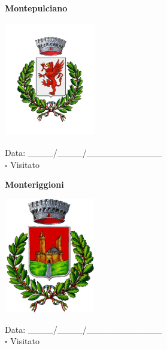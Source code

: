 \documentclass[a5paper,12pt]{article}
\begin{document}
\vspace{0.7cm}

\noindent
\begin{minipage}[t]{0.45\textwidth}
    \begin{center}
        \textbf{Montepulciano}
    \end{center}
    \vspace{-0.5cm} %
    \begin{center}
        \includegraphics[height= 5cm, width=4cm]{Toscana/Stemma Montepulciano.png}
    \end{center}
    \vspace{-0.4cm} %
    \begin{flushleft}
        Data: \_\_\_\_/\_\_\_\_/\_\_\_\_\_\_\_\_\_\_\_\_ \\
        $\square$ Visitato
    \end{flushleft}
\end{minipage}
\hfill
\noindent
\begin{minipage}[t]{0.45\textwidth}
    \begin{center}
        \textbf{Monteriggioni}
    \end{center}
    \vspace{-0.5cm} %
    \begin{center}
        \includegraphics[height= 5cm, width=4cm]{Toscana/Stemma Monteriggioni.png}
    \end{center}
    \vspace{-0.4cm} %
    \begin{flushleft}
        Data: \_\_\_\_/\_\_\_\_/\_\_\_\_\_\_\_\_\_\_\_\_ \\
        $\square$ Visitato
    \end{flushleft}
\end{minipage}
\hfill
\end{document}

